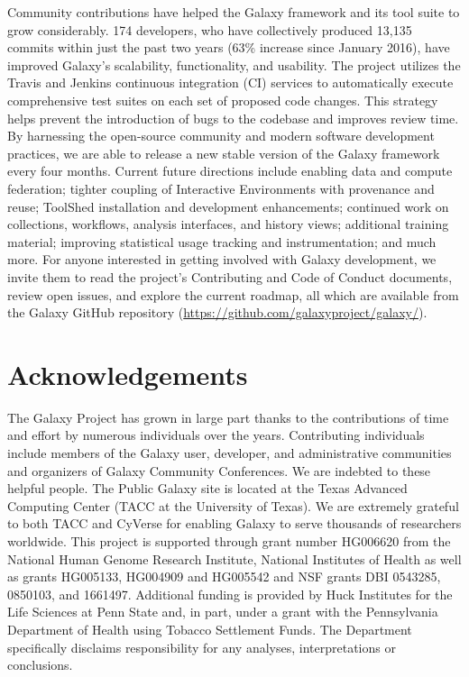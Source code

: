 Community contributions have helped the Galaxy framework and its tool suite to grow considerably. 174 developers, who have collectively produced 13,135 commits within just the past two years (63\% increase since January 2016), have improved Galaxy’s scalability, functionality, and usability. The project utilizes the Travis and Jenkins continuous integration (CI) services to automatically execute comprehensive test suites on each set of proposed code changes. This strategy helps prevent the introduction of bugs to the codebase and improves review time. By harnessing the open-source community and modern software development practices, we are able to release a new stable version of the Galaxy framework every four months. Current future directions include enabling data and compute federation; tighter coupling of Interactive Environments with provenance and reuse; ToolShed installation and development enhancements; continued work on collections, workflows, analysis interfaces, and history views; additional training material; improving statistical usage tracking and instrumentation; and much more. For anyone interested in getting involved with Galaxy development, we invite them to read the project’s Contributing and Code of Conduct documents, review open issues, and explore the current roadmap, all which are available from the Galaxy GitHub repository (\url{https://github.com/galaxyproject/galaxy/}).


\section*{Acknowledgements}
The Galaxy Project has grown in large part thanks to the contributions of time and effort by numerous individuals over the years. Contributing individuals include members of the Galaxy user, developer, and administrative communities and organizers of Galaxy Community Conferences. We are indebted to these helpful people. The Public Galaxy site is located at the Texas Advanced Computing Center (TACC at the University of Texas). We are extremely grateful to both TACC and CyVerse for enabling Galaxy to serve thousands of researchers worldwide. This project is supported through grant number HG006620 from the National Human Genome Research Institute, National Institutes of Health as well as grants HG005133, HG004909 and HG005542 and NSF grants DBI 0543285, 0850103, and 1661497. Additional funding is provided by Huck Institutes for the Life Sciences at Penn State and, in part, under a grant with the Pennsylvania Department of Health using Tobacco Settlement Funds. The Department specifically disclaims responsibility for any analyses, interpretations or conclusions.



